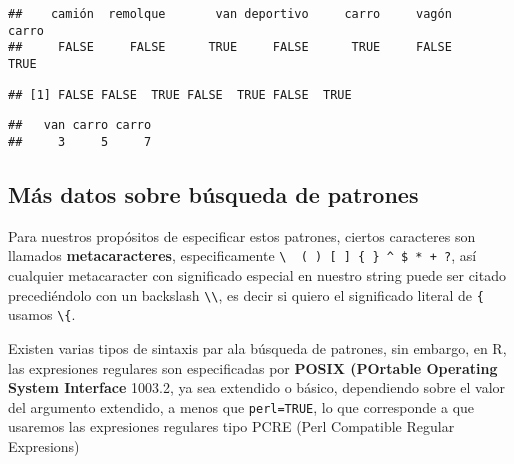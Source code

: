 \documentclass[]{article}
\newenvironment{Shaded}{\begin{snugshade}}{\end{snugshade}}
\newcommand{\KeywordTok}[1]{\textcolor[rgb]{0.13,0.29,0.53}{\textbf{#1}}}
\newcommand{\StringTok}[1]{\textcolor[rgb]{0.31,0.60,0.02}{#1}}
\newcommand{\OperatorTok}[1]{\textcolor[rgb]{0.81,0.36,0.00}{\textbf{#1}}}
\newcommand{\NormalTok}[1]{#1}
\begin{document}
\begin{verbatim}
##    camión  remolque       van deportivo     carro     vagón     carro 
##     FALSE     FALSE      TRUE     FALSE      TRUE     FALSE      TRUE
\end{verbatim}

\begin{Shaded}
\end{Shaded}

\begin{verbatim}
## [1] FALSE FALSE  TRUE FALSE  TRUE FALSE  TRUE
\end{verbatim}

\begin{Shaded}
\end{Shaded}

\begin{verbatim}
##   van carro carro 
##     3     5     7
\end{verbatim}

\subsection{Más datos sobre búsqueda de
patrones}\label{muxe1s-datos-sobre-buxfasqueda-de-patrones}

Para nuestros propósitos de especificar estos patrones, ciertos
caracteres son llamados \textbf{metacaracteres}, especificamente
\texttt{\textbackslash{}\ \textbar{}\ (\ )\ {[}\ {]}\ \{\ \}\ \^{}\ \$\ *\ +\ ?},
así cualquier metacaracter con significado especial en nuestro string
puede ser citado precediéndolo con un backslash
\texttt{\textbackslash{}\textbackslash{}}, es decir si quiero el
significado literal de \texttt{\{} usamos \texttt{\textbackslash{}\{}.

Existen varias tipos de sintaxis par ala búsqueda de patrones, sin
embargo, en R, las expresiones regulares son especificadas por
\textbf{POSIX (POrtable Operating System Interface} 1003.2, ya sea
extendido o básico, dependiendo sobre el valor del argumento extendido,
a menos que \texttt{perl=TRUE}, lo que corresponde a que usaremos las
expresiones regulares tipo PCRE (Perl Compatible Regular Expresions)
\end{document}
